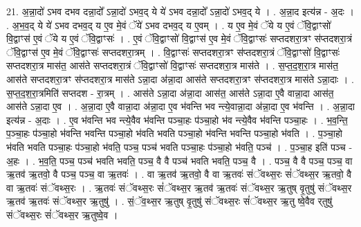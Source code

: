 \documentclass[17pt]{extarticle}
\begin{document}
21. अ॒न्ना॒दो॑ ऽभव दभव दन्ना॒दो᳚ ऽन्ना॒दो॑ ऽभव॒द् ये ये॑ ऽभव दन्ना॒दो᳚ ऽन्ना॒दो॑ ऽभव॒द् ये । . अ॒न्ना॒द इत्य॑न्न - अ॒दः । . अ॒भ॒व॒द् ये ये॑ ऽभव दभव॒द् य ए॒व मे॒वं ॅये॑ ऽभव दभव॒द् य ए॒वम् । . य ए॒व मे॒वं ॅये य ए॒वं ॅवि॒द्वाꣳसो॑ वि॒द्वाꣳस॑ ए॒वं ॅये य ए॒वं ॅवि॒द्वाꣳसः॑ । . ए॒वं ॅवि॒द्वाꣳसो॑ वि॒द्वाꣳस॑ ए॒व मे॒वं ॅवि॒द्वाꣳसः॑ सप्तदशरा॒त्रꣳ स॑प्तदशरा॒त्रं ॅवि॒द्वाꣳस॑ ए॒व मे॒वं ॅवि॒द्वाꣳसः॑ सप्तदशरा॒त्रम् । . वि॒द्वाꣳसः॑ सप्तदशरा॒त्रꣳ स॑प्तदशरा॒त्रं ॅवि॒द्वाꣳसो॑ वि॒द्वाꣳसः॑ सप्तदशरा॒त्र मास॑त॒ आस॑ते सप्तदशरा॒त्रं ॅवि॒द्वाꣳसो॑ वि॒द्वाꣳसः॑ सप्तदशरा॒त्र मास॑ते । . स॒प्त॒द॒श॒रा॒त्र मास॑त॒ आस॑ते सप्तदशरा॒त्रꣳ स॑प्तदशरा॒त्र मास॑ते ऽन्ना॒दा अ॑न्ना॒दा आस॑ते सप्तदशरा॒त्रꣳ स॑प्तदशरा॒त्र मास॑ते ऽन्ना॒दाः । . स॒प्त॒द॒श॒रा॒त्रमिति॑ सप्तदश - रा॒त्रम् । . आस॑ते ऽन्ना॒दा अ॑न्ना॒दा आस॑त॒ आस॑ते ऽन्ना॒दा ए॒वै वान्ना॒दा आस॑त॒ आस॑ते ऽन्ना॒दा ए॒व । . अ॒न्ना॒दा ए॒वै वान्ना॒दा अ॑न्ना॒दा ए॒व भ॑वन्ति भव न्त्ये॒वान्ना॒दा अ॑न्ना॒दा ए॒व भ॑वन्ति । . अ॒न्ना॒दा इत्य॑न्न - अ॒दाः । . ए॒व भ॑वन्ति भव न्त्ये॒वैव भ॑वन्ति पञ्चा॒हः प॑ञ्चा॒हो भ॑व न्त्ये॒वैव भ॑वन्ति पञ्चा॒हः । . भ॒व॒न्ति॒ प॒ञ्चा॒हः प॑ञ्चा॒हो भ॑वन्ति भवन्ति पञ्चा॒हो भ॑वति भवति पञ्चा॒हो भ॑वन्ति भवन्ति पञ्चा॒हो भ॑वति । . प॒ञ्चा॒हो भ॑वति भवति पञ्चा॒हः प॑ञ्चा॒हो भ॑वति॒ पञ्च॒ पञ्च॑ भवति पञ्चा॒हः प॑ञ्चा॒हो भ॑वति॒ पञ्च॑ । . प॒ञ्चा॒ह इति॑ पञ्च - अ॒हः । . भ॒व॒ति॒ पञ्च॒ पञ्च॑ भवति भवति॒ पञ्च॒ वै वै पञ्च॑ भवति भवति॒ पञ्च॒ वै । . पञ्च॒ वै वै पञ्च॒ पञ्च॒ वा ऋ॒तव॑ ऋ॒तवो॒ वै पञ्च॒ पञ्च॒ वा ऋ॒तवः॑ । . वा ऋ॒तव॑ ऋ॒तवो॒ वै वा ऋ॒तवः॑ संॅवथ्स॒रः सं॑ॅवथ्स॒र ऋ॒तवो॒ वै वा ऋ॒तवः॑ संॅवथ्स॒रः । . ऋ॒तवः॑ संॅवथ्स॒रः सं॑ॅवथ्स॒र ऋ॒तव॑ ऋ॒तवः॑ संॅवथ्स॒र ऋ॒तुष् वृ॒तुषु॑ संॅवथ्स॒र ऋ॒तव॑ ऋ॒तवः॑ संॅवथ्स॒र ऋ॒तुषु॑ । . सं॒ॅव॒थ्स॒र ऋ॒तुष् वृ॒तुषु॑ संॅवथ्स॒रः सं॑ॅवथ्स॒र ऋ॒तु ष्वे॒वैव र्‌तुषु॑ संॅवथ्स॒रः सं॑ॅवथ्स॒र ऋ॒तुष्वे॒व । \newline
\end{document}
